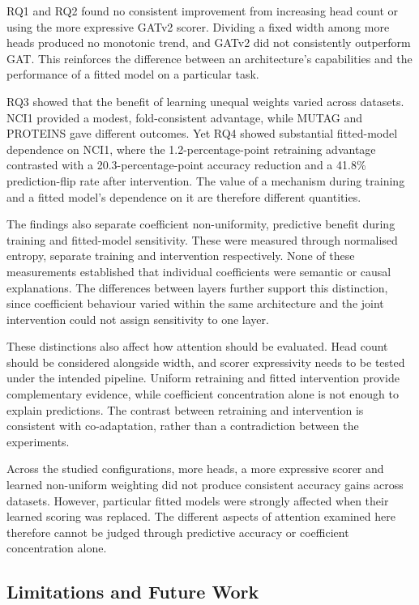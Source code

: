 \documentclass[11pt,a4paper]{article}
\begin{document}
RQ1 and RQ2 found no consistent improvement from increasing head count or using the more expressive GATv2 scorer. Dividing a fixed width among more heads produced no monotonic trend, and GATv2 did not consistently outperform GAT. This reinforces the difference between an architecture's capabilities and the performance of a fitted model on a particular task.

RQ3 showed that the benefit of learning unequal weights varied across datasets. NCI1 provided a modest, fold-consistent advantage, while MUTAG and PROTEINS gave different outcomes. Yet RQ4 showed substantial fitted-model dependence on NCI1, where the 1.2-percentage-point retraining advantage contrasted with a 20.3-percentage-point accuracy reduction and a 41.8\% prediction-flip rate after intervention. The value of a mechanism during training and a fitted model's dependence on it are therefore different quantities.

The findings also separate coefficient non-uniformity, predictive benefit during training and fitted-model sensitivity. These were measured through normalised entropy, separate training and intervention respectively. None of these measurements established that individual coefficients were semantic or causal explanations. The differences between layers further support this distinction, since coefficient behaviour varied within the same architecture and the joint intervention could not assign sensitivity to one layer.

These distinctions also affect how attention should be evaluated. Head count should be considered alongside width, and scorer expressivity needs to be tested under the intended pipeline. Uniform retraining and fitted intervention provide complementary evidence, while coefficient concentration alone is not enough to explain predictions. The contrast between retraining and intervention is consistent with co-adaptation, rather than a contradiction between the experiments.

Across the studied configurations, more heads, a more expressive scorer and learned non-uniform weighting did not produce consistent accuracy gains across datasets. However, particular fitted models were strongly affected when their learned scoring was replaced. The different aspects of attention examined here therefore cannot be judged through predictive accuracy or coefficient concentration alone.

\subsection{Limitations and Future Work}
\label{sec:limitations}
\end{document}

